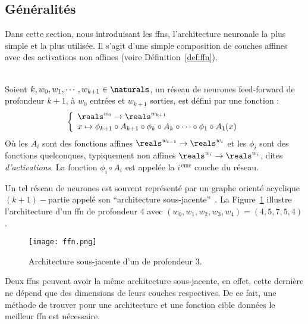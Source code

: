 \subsection{Généralités}

Dans cette section, nous introduisant les \glspl{ffn},
l'architecture neuronale la plus simple et la plus utilisée.
Il s'agit d'une simple composition de couches affines avec des activations non affines 
(voire Définition~\ref{def:ffn}).


\begin{definition}\ \\
    \label{def:ffn}
    Soient \(k, w_0, w_1, \cdots, w_{k+1}\in\naturals\), 
    un réseau de neurones feed-forward de profondeur \(k+1\), à \(w_0\) entrées et \(w_{k+1}\) sorties, 
    est défini par une fonction :
    \begin{equation}
        \label{eq:ffn}
        \left\{
        \begin{array}{l}
            \reals^{w_0} \to \reals^{w_{k+1}}\\
            x\mapsto
            \phi_{k+1} \circ A_{k+1} \circ \phi_k \circ A_k \circ \cdots \circ \phi_1 \circ A_1(x)
        \end{array}
        \right.
    \end{equation}
    Où les \(A_i\) sont des fonctions affines \(\reals^{w_{i-1}}\to\reals^{w_i}\) 
    et les \(\phi_i\) sont des fonctions quelconques, typiquement non affines
    \(\reals^{w_i}\to\reals^{w_i}\), dites \emph{d'activations}.
    La fonction \(\phi_i\circ A_i\) est appelée la \(i^{\, \mathrm{eme}}\) couche du réseau.
\end{definition}

Un tel réseau de neurones est souvent représenté par 
un graphe orienté acyclique \((k+1)-\)partie  appelé son ``architecture sous-jacente''~\parencite{Kearns_Vazirani_1994}. 
La Figure~\ref{fig:ffn} illustre l'architecture d'un \gls{ffn} de profondeur 4
avec \((w_0, w_1, w_2, w_3, w_4) = (4, 5, 7, 5, 4)\).


\begin{figure}[hbt]
    \begin{center}
        \texttt{[image: ffn.png]}
    \end{center}
    \caption{Architecture sous-jacente d'un  de profondeur 3.}
    \label{fig:ffn}
\end{figure}

Deux \glspl{ffn} peuvent avoir la même architecture sous-jacente,
en effet, cette dernière ne dépend que des dimensions de leurs couches respectives.
De ce fait, une méthode de trouver pour une architecture et une fonction cible données 
le meilleur \gls{ffn} est nécessaire.

